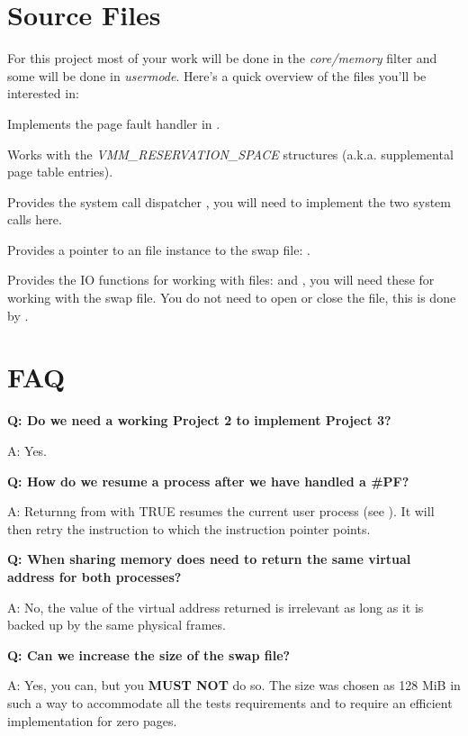 \section{Source Files}

For this project most of your work will be done in the \textit{core/memory} filter and some will
be done in \textit{usermode}. Here's a quick overview of the files you'll be interested in:


Implements the page fault handler in .


Works with the \textit{VMM\_RESERVATION\_SPACE} structures (a.k.a. supplemental page table entries).


Provides the system call dispatcher , you will need to implement the two system
calls here.


Provides a pointer to an file instance to the swap file: .


Provides the IO functions for working with files:  and , you will
need these for working with the swap file. You do not need to open or close the file, this is done
by \projectname.

\section{FAQ}

\textbf{Q: Do we need a working Project 2 to implement Project 3?}

A: Yes.

\newline

\textbf{Q: How do we resume a process after we have handled a \#PF?}

A: Returnng from  with TRUE resumes the current user process (see
). It will then retry the instruction to which the instruction pointer
points.

\newline

\textbf{Q: When sharing memory does  need to return the same virtual
address for both processes?}

A: No, the value of the virtual address returned is irrelevant as long as it is backed up by the
same physical frames.

\newline

\textbf{Q: Can we increase the size of the swap file?}

A: Yes, you can, but you \textbf{MUST NOT} do so. The size was chosen as 128 MiB in such a way to
accommodate all the tests requirements and to require an efficient implementation for zero pages.